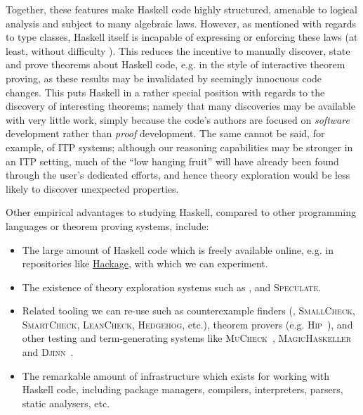 Together, these features make Haskell code highly structured, amenable to
logical analysis and subject to many algebraic laws. However, as mentioned with
regards to type classes, Haskell itself is incapable of expressing or enforcing
these laws (at least, without difficulty \cite{lindley2014hasochism}). This
reduces the incentive to manually discover, state and prove theorems about
Haskell code, e.g. in the style of interactive theorem proving, as these results
may be invalidated by seemingly innocuous code changes. This puts Haskell in a
rather special position with regards to the discovery of interesting theorems;
namely that many discoveries may be available with very little work, simply
because the code's authors are focused on \emph{software} development rather
than \emph{proof} development. The same cannot be said, for example, of ITP
systems; although our reasoning capabilities may be stronger in an ITP setting,
much of the ``low hanging fruit'' will have already been found through the
user's dedicated efforts, and hence theory exploration would be less likely to
discover unexpected properties.

Other empirical advantages to studying Haskell, compared to other programming
languages or theorem proving systems, include:

\begin{itemize}
\item The large amount of Haskell code which is freely available online, e.g. in
  repositories like \href{http://hackage.haskell.org}{Hackage}, with which we
  can experiment.

\item The existence of theory exploration systems such as \hspec{}, \qspec{} and
  \textsc{Speculate}.

\item Related tooling we can re-use such as counterexample finders (\qcheck{},
  \textsc{SmallCheck}, \textsc{SmartCheck}, \textsc{LeanCheck},
  \textsc{Hedgehog}, etc.), theorem provers
  (e.g. \textsc{Hip}~\cite{rosen2012proving}), and other testing and
  term-generating systems like \textsc{MuCheck}~\cite{le2014mucheck},
  \textsc{MagicHaskeller}~\cite{katayama2011magichaskeller} and
  \textsc{Djinn}~\cite{augustsson2005djinn}.

\item The remarkable amount of infrastructure which exists for working with
  Haskell code, including package managers, compilers, interpreters, parsers,
  static analysers, etc.
\end{itemize}


